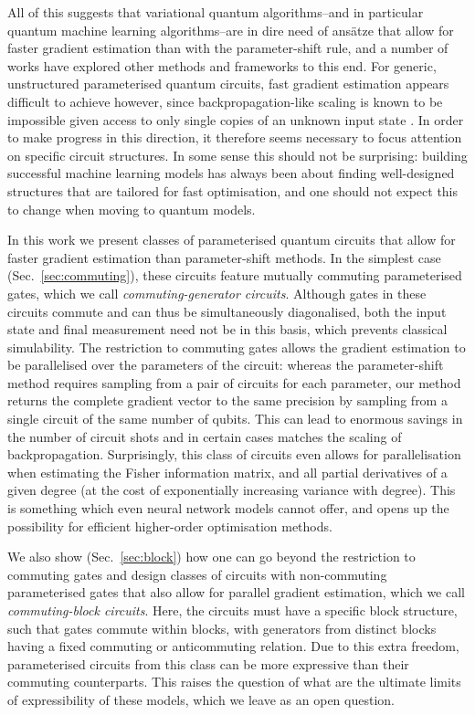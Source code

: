 \documentclass[a4paper,twocolumn,11pt]{quantumarticle}
\begin{document}
All of this suggests that variational quantum algorithms--and in particular quantum machine learning algorithms--are in dire need of ans\"atze that allow for faster gradient estimation than with the parameter-shift rule, and a number of works have explored other methods \cite{anastasiou2023really,basheer2022alternating,kasture2022protocols,frugal1,frugal2,frugal3,frugal4} and frameworks \cite{verdon2018universal} to this end. For generic, unstructured parameterised quantum circuits, fast gradient estimation appears difficult to achieve however, since backpropagation-like scaling is known to be impossible given access to only single copies of an unknown input state \cite{abbas2023quantum}. In order to make progress in this direction, it therefore seems necessary to focus attention on specific circuit structures. In some sense this should not be surprising: building successful machine learning models has always been about finding well-designed structures that are tailored for fast optimisation, and one should not expect this to change when moving to quantum models.   

In this work we present classes of parameterised quantum circuits that allow for faster gradient estimation than parameter-shift methods. In the simplest case (Sec.\ \ref{sec:commuting}), these circuits feature mutually commuting parameterised gates, which we call \emph{commuting-generator circuits}. Although gates in these circuits commute and can thus be simultaneously diagonalised, both the input state and final measurement need not be in this basis, which prevents classical simulability. The restriction to commuting gates allows the gradient estimation to be parallelised over the parameters of the circuit: whereas the parameter-shift method requires sampling from a pair of circuits for each parameter, our method returns the complete gradient vector to the same precision by sampling from a single circuit of the same number of qubits. This can lead to enormous savings in the number of circuit shots and in certain cases matches the scaling of backpropagation. Surprisingly, this class of circuits even allows for parallelisation when estimating the Fisher information matrix, and all partial derivatives of a given degree (at the cost of exponentially increasing variance with degree). This is something which even neural network models cannot offer, and opens up the possibility for efficient higher-order optimisation methods. 

We also show (Sec.\ \ref{sec:block}) how one can go beyond the restriction to commuting gates and design classes of circuits with non-commuting parameterised gates that also allow for parallel gradient estimation, which we call \emph{commuting-block circuits}. Here, the circuits must have a specific block structure, such that gates commute within blocks, with generators from distinct blocks having a fixed commuting or anticommuting relation. Due to this extra freedom, parameterised circuits from this class can be more expressive than their commuting counterparts. This raises the question of what are the ultimate limits of expressibility of these models, which we leave as an open question.  
\end{document}
